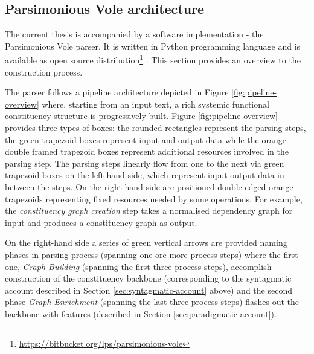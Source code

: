 \subsection{Parsimonious Vole architecture}
\label{sec:architecture}
The current thesis is accompanied by a software implementation - the Parsimonious Vole parser. It is written in Python programming language and is available as open source distribution\footnote{\url{https://bitbucket.org/lps/parsimonious-vole}} . This section provides an overview to the construction process.

The parser follows a pipeline architecture depicted in Figure \ref{fig:pipeline-overview} where, starting from an input text, a rich systemic functional constituency structure is progressively built. Figure \ref{fig:pipeline-overview} provides three types of boxes: the rounded rectangles represent the parsing steps, the green trapezoid boxes represent input and output data while the orange double framed trapezoid boxes represent additional resources involved in the parsing step. The parsing steps linearly flow from one to the next via green trapezoid boxes on the left-hand side, which represent input-output data in between the steps. On the right-hand side are positioned double edged orange trapezoids representing fixed resources needed by some operations. For example, the \textit{constituency graph creation} step takes a normalised dependency graph for input and produces a constituency graph as output.

On the right-hand side a series of green vertical arrows are provided naming phases in parsing process (spanning one ore more process steps) where the first one, \textit{Graph Building} (spanning the first three process steps), accomplish construction of the constituency backbone (corresponding to the syntagmatic account described in Section \ref{sec:syntagmatic-account} above) and the second phase \textit{Graph Enrichment} (spanning the last three process steps) flashes out the backbone with features (described in Section \ref{sec:paradigmatic-account}). 

